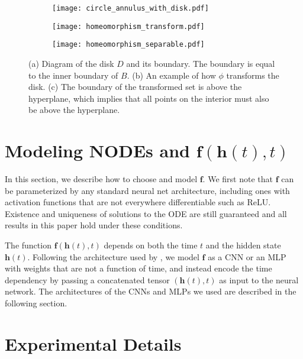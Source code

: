 \documentclass{article}
\begin{document}
\begin{figure}[h]
\centering
\begin{subfigure}[t]{0.2\linewidth}
\centering
\texttt{[image: circle\_annulus\_with\_disk.pdf]}
\caption{}
\end{subfigure}\hspace{0.05\linewidth}
\begin{subfigure}[t]{0.4\linewidth}
\centering
\texttt{[image: homeomorphism\_transform.pdf]}
\caption{}
\end{subfigure}\hspace{0.02\linewidth}
\begin{subfigure}[t]{0.3\linewidth}
\centering
\texttt{[image: homeomorphism\_separable.pdf]}
\caption{}
\end{subfigure}
\caption{(a) Diagram of the disk $D$ and its boundary. The boundary is equal to the inner boundary of $B$. (b) An example of how $\phi$ transforms the disk. (c) The boundary of the transformed set is above the hyperplane, which implies that all points on the interior must also be above the hyperplane.}
\end{figure}

\section{Modeling NODEs and $\mathbf{f}(\mathbf{h}(t), t)$}

In this section, we describe how to choose and model $\mathbf{f}$. We first note that $\mathbf{f}$ can be parameterized by any standard neural net architecture, including ones with activation functions that are not everywhere differentiable such as ReLU. Existence and uniqueness of solutions to the ODE are still guaranteed and all results in this paper hold under these conditions.

The function $\mathbf{f}(\mathbf{h}(t), t)$ depends on both the time $t$ and the hidden state $\mathbf{h}(t)$. Following the architecture used by \cite{chen2018neural}, we model $\mathbf{f}$ as a CNN or an MLP with weights that are not a function of time, and instead encode the time dependency by passing a concatenated tensor $(\mathbf{h}(t), t)$ as input to the neural network. The architectures of the CNNs and MLPs we used are described in the following section.

\section{Experimental Details}
\end{document}
